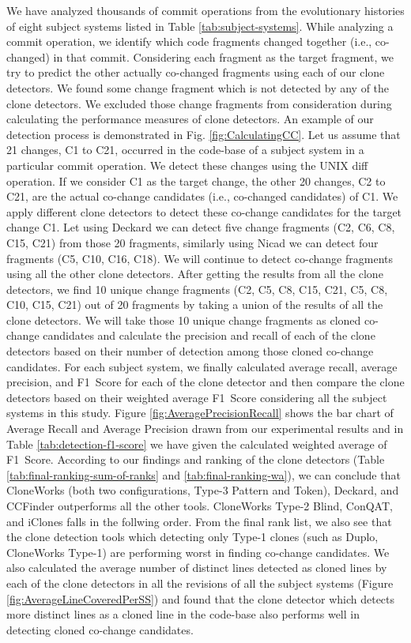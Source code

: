 \documentclass[review]{elsarticle}
\begin{document}
We have analyzed thousands of commit operations from the evolutionary histories of eight subject systems listed in Table \ref{tab:subject-systems}. While analyzing a commit operation, we identify which code fragments changed together (i.e., co-changed) in that commit. Considering each fragment as the target fragment, we try to predict the other actually co-changed fragments using each of our clone detectors. We found some change fragment which is not detected by any of the clone detectors. We excluded those change fragments from consideration during calculating the performance measures of clone detectors. An example of our detection process is demonstrated in Fig. \ref{fig:CalculatingCC}. Let us assume that 21 changes, C1 to C21, occurred in the code-base of a subject system in a particular commit operation. We detect these changes using the UNIX diff operation. If we consider C1 as the target change, the other 20 changes, C2 to C21, are the actual co-change candidates (i.e., co-changed candidates) of C1. We apply different clone detectors to detect these co-change candidates for the target change C1. Let using Deckard we can detect five change fragments (C2, C6, C8, C15, C21) from those 20 fragments, similarly using Nicad we can detect four fragments (C5, C10, C16, C18). We will continue to detect co-change fragments using all the other clone detectors. After getting the results from all the clone detectors, we find 10 unique change fragments (C2, C5, C8, C15, C21, C5, C8, C10, C15, C21) out of 20 fragments by taking a union of the results of all the clone detectors. We will take those 10 unique change fragments as cloned co-change candidates and calculate the precision and recall of each of the clone detectors based on their number of detection among those cloned co-change candidates. For each subject system, we finally calculated average recall, average precision, and F1~Score for each of the clone detector and then compare the clone detectors based on their weighted average F1~Score considering all the subject systems in this study. Figure \ref{fig:AveragePrecisionRecall} shows the bar chart of Average Recall and Average Precision drawn from our experimental results and in Table \ref{tab:detection-f1-score} we have given the calculated weighted average of F1~Score. According to our  findings and ranking of the clone detectors (Table \ref{tab:final-ranking-sum-of-ranks} and \ref{tab:final-ranking-wa}), we can conclude that CloneWorks (both two configurations, Type-3 Pattern and Token), Deckard, and CCFinder outperforms all the other tools. CloneWorks Type-2 Blind, ConQAT, and iClones falls in the follwing order. From the final rank list, we also see that the clone detection tools which detecting only Type-1 clones (such as Duplo, CloneWorks Type-1) are performing worst in finding co-change candidates.  We also calculated the average number of distinct lines detected as cloned lines by each of the clone detectors in all the revisions of all the subject systems (Figure \ref{fig:AverageLineCoveredPerSS}) and found that the clone detector which detects more distinct lines as a cloned line in the code-base also performs well in detecting cloned co-change candidates.
\end{document}
